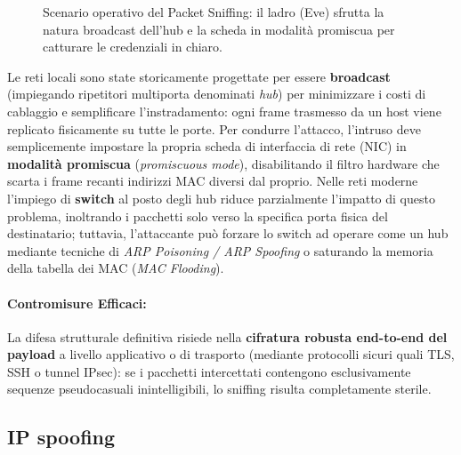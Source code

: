 \documentclass[../../main.tex]{subfiles}
\begin{document}
\begin{figure}[htbp]
{%
}
\caption{Scenario operativo del Packet Sniffing: il ladro (Eve) sfrutta la natura broadcast dell'hub e la scheda in modalità promiscua per catturare le credenziali in chiaro.}
\label{fig:packet_sniffing}
\end{figure}

Le reti locali sono state storicamente progettate per essere \textbf{broadcast} (impiegando ripetitori multiporta denominati \textit{hub}) per minimizzare i costi di cablaggio e semplificare l'instradamento: ogni frame trasmesso da un host viene replicato fisicamente su tutte le porte. Per condurre l'attacco, l'intruso deve semplicemente impostare la propria scheda di interfaccia di rete (NIC) in \textbf{modalità promiscua} (\textit{promiscuous mode}), disabilitando il filtro hardware che scarta i frame recanti indirizzi MAC diversi dal proprio. Nelle reti moderne l'impiego di \textbf{switch} al posto degli hub riduce parzialmente l'impatto di questo problema, inoltrando i pacchetti solo verso la specifica porta fisica del destinatario; tuttavia, l'attaccante può forzare lo switch ad operare come un hub mediante tecniche di \textit{ARP Poisoning / ARP Spoofing} o saturando la memoria della tabella dei MAC (\textit{MAC Flooding}).

\paragraph{Contromisure Efficaci:}
La difesa strutturale definitiva risiede nella \textbf{cifratura robusta end-to-end del payload} a livello applicativo o di trasporto (mediante protocolli sicuri quali TLS, SSH o tunnel IPsec): se i pacchetti intercettati contengono esclusivamente sequenze pseudocasuali inintelligibili, lo sniffing risulta completamente sterile.

\subsection{IP spoofing}
\label{subsec:ip_spoofing}
\end{document}
